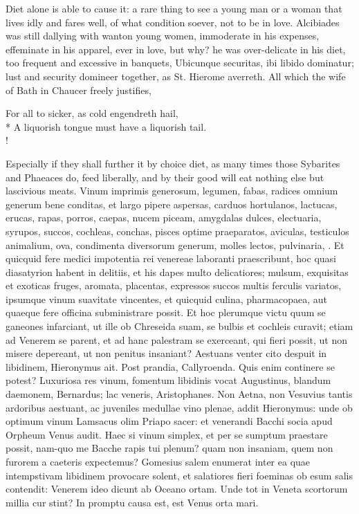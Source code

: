 Diet alone is able to cause it: a rare thing to see a young man or a
woman that lives idly and fares well, of what condition soever, not to
be in love. Alcibiades was still dallying with wanton young
women, immoderate in his expenses, effeminate in his apparel, ever in
love, but why? he was over-delicate in his diet, too frequent and
excessive in banquets, Ubicunque securitas, ibi libido dominatur; lust
and security domineer together, as St. Hierome averreth. All which the
wife of Bath in Chaucer freely justifies,
%
{\gothfont%
\begin{versewithlinenos}{2}{1}{1}%
For all to sicker, as cold engendreth hail,\\*
A liquorish tongue must have a liquorish tail.\\!
\end{versewithlinenos}%
}%

Especially if they shall further it by choice diet, as many times those
Sybarites and Phaeaces do, feed liberally, and by their good will eat
nothing else but lascivious meats. Vinum imprimis generosum,
legumen, fabas, radices omnium generum bene conditas, et largo pipere
aspersas, carduos hortulanos, lactucas, erucas, rapas, porros,
caepas, nucem piceam, amygdalas dulces, electuaria, syrupos, succos,
cochleas, conchas, pisces optime praeparatos, aviculas, testiculos
animalium, ova, condimenta diversorum generum, molles lectos,
pulvinaria, \etc{}. Et quicquid fere medici impotentia rei venereae
laboranti praescribunt, hoc quasi diasatyrion habent in delitiis, et
his dapes multo delicatiores; mulsum, exquisitas et exoticas fruges,
aromata, placentas, expressos succos multis ferculis variatos, ipsumque
vinum suavitate vincentes, et quicquid culina, pharmacopaea, aut
quaeque fere officina subministrare possit. Et hoc plerumque victu quum
se ganeones infarciant, ut ille ob Chreseida suam, se bulbis et
cochleis curavit; etiam ad Venerem se parent, et ad hanc palestram se
exerceant, qui fieri possit, ut non misere depereant, ut non
penitus insaniant? Aestuans venter cito despuit in libidinem,
Hieronymus ait. Post prandia, Callyroenda. Quis enim continere se
potest? Luxuriosa res vinum, fomentum libidinis vocat Augustinus,
blandum daemonem, Bernardus; lac veneris, Aristophanes. Non Aetna, non
Vesuvius tantis ardoribus aestuant, ac juveniles medullae vino plenae,
addit Hieronymus: unde ob optimum vinum Lamsacus olim Priapo
sacer: et venerandi Bacchi socia apud  Orpheum Venus audit. Haec
si vinum simplex, et per se sumptum praestare possit, nam-quo me
Bacche rapis tui plenum? quam non insaniam, quem non furorem a caeteris
expectemus? Gomesius salem enumerat inter ea quae intempstivam
libidinem provocare solent, et salatiores fieri foeminas ob esum salis
contendit: Venerem ideo dicunt ab Oceano ortam.
Unde tot in Veneta scortorum millia cur stint?
In promptu causa est, est Venus orta mari.

